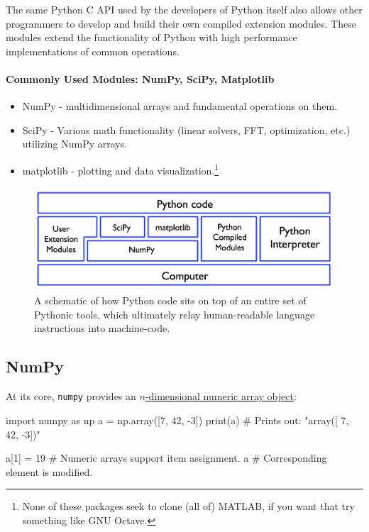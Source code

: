 \documentclass[12pt,letterpaper,twoside]{article}
\begin{document}
The same Python C API used by the developers of Python itself also
allows other programmers to develop and build their own compiled
extension modules.
These modules extend the functionality of Python with high performance
implementations of common operations.

\paragraph{Commonly Used Modules: NumPy, SciPy, Matplotlib}

\begin{itemize}
\item
  NumPy - multidimensional arrays and fundamental operations on them.
\item
  SciPy - Various math functionality (linear solvers, FFT, optimization,
  etc.) utilizing NumPy arrays.
\item
  matplotlib - plotting and data visualization.\footnote{None of these packages seek to clone (all of) MATLAB, if you want that try
something like GNU Octave.}
\end{itemize}

\begin{figure}[h]
\centering
\includegraphics[scale=0.45]{fig/python-stack.png}
\caption{A schematic of how Python code sits on top of an entire set
  of Pythonic tools, which ultimately relay human-readable language instructions into
  machine-code.}
\end{figure}

\subsection{NumPy}
At its core, \texttt{numpy} provides an
\href{https://docs.scipy.org/doc/numpy/reference/arrays.html}
{$n$-dimensional numeric array object}:

\begin{python}
import numpy as np
a = np.array([7, 42, -3])
print(a)                     # Prints out: "array([ 7, 42, -3])"

a[1] = 19                    # Numeric arrays support item assignment.
a                            # Corresponding element is modified.
\end{python}
\end{document}
